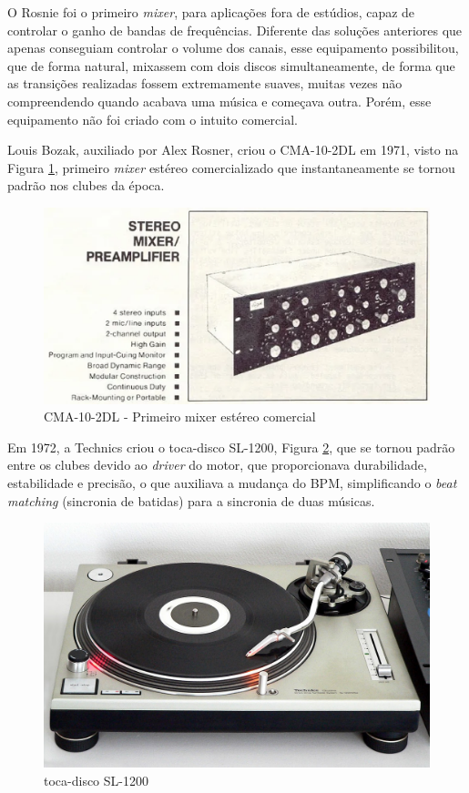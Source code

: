 \par
O Rosnie foi o primeiro \textit{mixer}, para aplicações fora de estúdios, capaz de controlar o ganho de bandas de frequências. Diferente das soluções anteriores que apenas conseguiam controlar o volume dos canais, esse equipamento possibilitou, que de forma natural, mixassem com dois discos simultaneamente, de forma que as transições realizadas fossem extremamente suaves, muitas vezes não compreendendo quando acabava uma música e começava outra. Porém, esse equipamento não foi criado com o intuito comercial.
\par
Louis Bozak, auxiliado por Alex Rosner, criou o CMA-10-2DL em 1971, visto na Figura \ref{fig10}, primeiro \textit{mixer} estéreo comercializado que instantaneamente se tornou padrão nos clubes da época.

\begin{figure}[h]
	\centering
    \includegraphics[scale=0.6]{figuras/fig10.eps}
	\caption{CMA-10-2DL - Primeiro mixer estéreo comercial \cite{electronicaptBozak102}}
	\label{fig10}
\end{figure}
\par
Em 1972, a Technics criou o toca-disco SL-1200, Figura \ref{fig14}, que se tornou padrão entre os clubes devido ao \textit{driver} do motor, que proporcionava durabilidade, estabilidade e precisão, o que auxiliava a mudança do BPM, simplificando o \textit{beat matching} (sincronia de batidas) para a sincronia de duas músicas.

\begin{figure}[h]
	\centering
    \includegraphics[scale=0.25]{figuras/fig14.png}
	\caption{toca-disco SL-1200 \cite{wikimediaFileTechnicsSL1200MK22jpg}}
	\label{fig14}
\end{figure}


